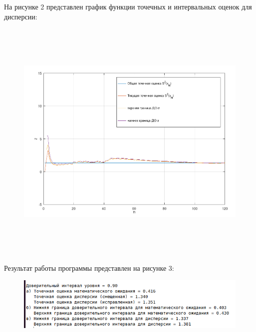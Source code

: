 \newpage

На рисунке 2 представлен график функции точечных и интервальных оценок для дисперсии:
\FloatBarrier
\begin{figure}[h]
	\begin{center}
		\includegraphics[width=\linewidth, height=12cm]{inc/s2.png}
	\end{center}
\end{figure}
\FloatBarrier

Результат работы программы представлен на рисунке 3:
\FloatBarrier
\begin{figure}[h]
	\begin{center}
		\includegraphics[width=\linewidth]{inc/result.png}
	\end{center}
\end{figure}
\FloatBarrier
